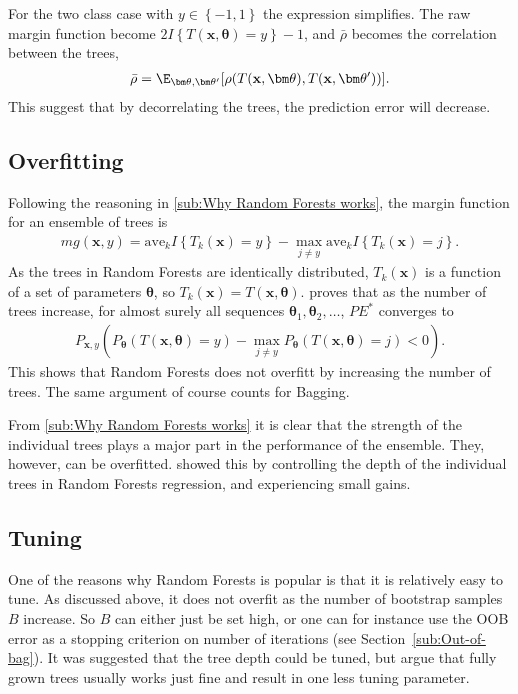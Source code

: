 For the two class case with $y \in \left\{ -1, 1 \right\}$ the expression simplifies. The raw margin function become $2 I\left\{ T(\mathbf{x}, \bm \theta) = y \right\} - 1$, and $\bar \rho$ becomes the correlation between the trees,
\begin{align}
  \bar \rho = \E_{\bm \theta, \bm \theta'}[\rho(T(\mathbf{x}, \bm \theta), T(\mathbf{x}, \bm \theta'))]. 
\end{align}
This suggest that by decorrelating the trees, the prediction error will decrease. 



\subsection{Overfitting}
\label{sub:Overfitting}
Following the reasoning in \ref{sub:Why Random Forests works}, the margin function for an ensemble of trees is
\begin{align}
  mg(\mathbf{x}, y) = \mathrm{ave}_k I\left\{ T_k(\mathbf{x}) = y \right\} - 
  \max_{j \neq y} \mathrm{ave}_k I\left\{ T_k(\mathbf{x}) = j \right\}.
\end{align}
As the trees in Random Forests are identically distributed, $T_k(\mathbf{x})$ is a function of a set of parameters $\bm \theta$, so $T_k(\mathbf{x}) = T(\mathbf{x}, \bm \theta)$. \cite{randomforests} proves that as the number of trees increase, for almost surely all sequences $\bm \theta_1, \bm \theta_2, \ldots$, $PE^*$ converges to 
\begin{align}
  P_{\mathbf{x}, y} (P_{\bm \theta} (T(\mathbf{x}, \bm \theta) = y) - \max_{j \neq y} P_{\bm \theta}(T(\mathbf{x}, \bm \theta) = j) < 0).
\end{align}
This shows that Random Forests does not overfitt by increasing the number of trees. The same argument of course counts for Bagging. 

From \ref{sub:Why Random Forests works} it is clear that the strength of the individual trees plays a major part in the performance of the ensemble. They, however, can be overfitted. \cite{segal2004} showed this by controlling the depth of the individual trees in Random Forests regression, and experiencing small gains. 


\subsection{Tuning}
\label{sub:Tuning}
One of the reasons why Random Forests is popular is that it is relatively easy to tune. As discussed above, it does not overfit as the number of bootstrap samples $B$ increase. So $B$ can either just be set high, or one can for instance use the OOB error as a stopping criterion on number of iterations (see Section~\ref{sub:Out-of-bag}). It was suggested that the tree depth could be tuned, but \cite{modstat} argue that fully grown trees usually works just fine and result in one less tuning parameter. 

